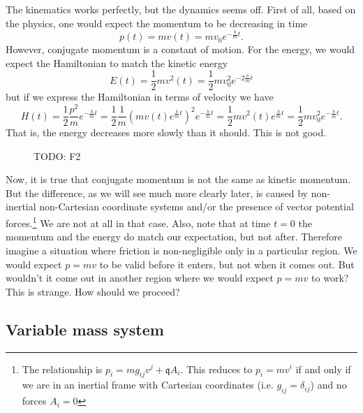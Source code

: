 The kinematics works perfectly, but the dynamics seems off. First of all, based on the physics, one would expect the momentum to be decreasing in time
\begin{equation}
	p(t)=m v(t) = m v_0 e^{-\frac{b}{m}t}.
\end{equation}
However, conjugate momentum is a constant of motion. For the energy, we would expect the Hamiltonian to match the kinetic energy
\begin{equation}
	E(t)=\frac{1}{2} m v^2(t) = \frac{1}{2} m v_0^2 e^{-2\frac{b}{m}t}
\end{equation}
but if we express the Hamiltonian in terms of velocity we have
\begin{equation}
	H(t)=\frac{1}{2} \frac{p^2}{m} e^{-\frac{b}{m}t} = \frac{1}{2} \frac{1}{m} \left( m v(t) e^{\frac{b}{m}t} \right)^2 e^{-\frac{b}{m}t}= \frac{1}{2} m v^2(t) e^{\frac{b}{m}t} = \frac{1}{2} m v_0^2 e^{-\frac{b}{m}t}.
\end{equation}
That is, the energy decreases more slowly than it should. This is not good.

\begin{figure}
	\centering
	\begin{tikzpicture}
	\end{tikzpicture}
	\caption {TODO: F2}
\end{figure}

Now, it is true that conjugate momentum is not the same as kinetic momentum. But the difference, as we will see much more clearly later, is caused by non-inertial non-Cartesian coordinate systems and/or the presence of vector potential forces.\footnote{The relationship is $p_i = m g_{ij} v^j + \mathfrak{q} A_i$. This reduces to $p_i = m v^i$ if and only if we are in an inertial frame with Cartesian coordinates (i.e. $g_{ij}=\delta_{ij}$) and no forces $A_i = 0$} We are not at all in that case. Also, note that at time $t=0$ the momentum and the energy do match our expectation, but not after. Therefore imagine a situation where friction is non-negligible only in a particular region. We would expect $p=mv$ to be valid before it enters, but not when it comes out. But wouldn't it come out in another region where we would expect $p=mv$ to work? This is strange. How should we proceed?

\subsection{Variable mass system}

